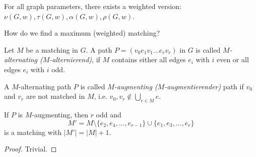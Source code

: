 For all graph parameters, there exists a weighted version:
$\nu(G, w), \tau(G, w), \alpha(G, w), \rho(G, w)$.

\begin{qstn+}
How do we find a maximum (weighted) matching?
\end{qstn+}

\begin{defn} %
Let $M$ be a matching in $G$. A path $P = (v_0 e_1 v_1 ... e_r v_r)$ in $G$
is called \emph{$M$-alternating ($M$-alternierend)}, if $M$ contains either
all edges $e_i$ with $i$ even or all edges $e_i$ with $i$ odd.

A $M$-alternating path $P$ is called \emph{$M$-augmenting ($M$-augmentierender)} path if $v_0$ and
$v_r$ are not matched in $M$, i.e. $v_0, v_r \not\in \bigcup_{e \in M} e$.
\end{defn}

\begin{lem} %
If $P$ is $M$-augmenting, then $r$ odd and
\[
	M' = M \setminus \{ e_2, e_4, ..., e_{r-1} \} \cup \{ e_1, e_3, ..., e_r \}
\]
is a matching with $|M'| = |M| + 1$.
\end{lem}
\begin{proof}
Trivial.
\end{proof}